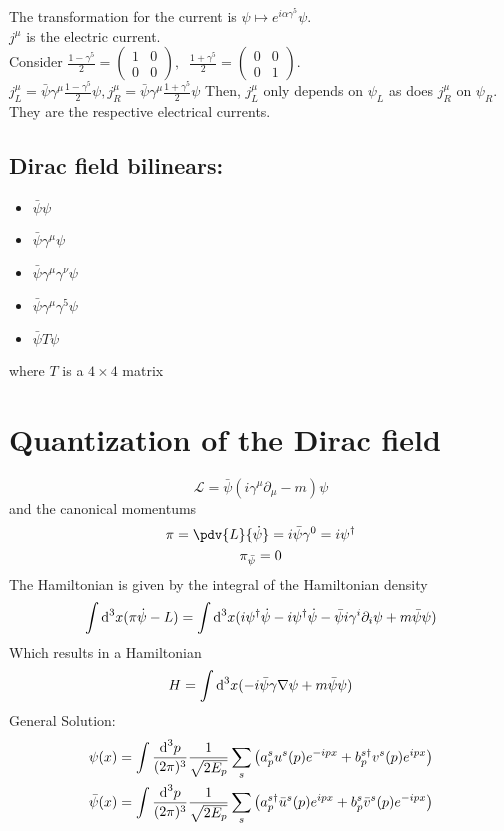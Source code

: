 \documentclass[]{scrartcl}
\begin{document}
The transformation for the current is $\psi \mapsto e^{i\alpha\gamma^5}\psi$.\\
$j^\mu$ is the electric current.\\
Consider $\frac{1 - \gamma^5}{2} = 
\begin{pmatrix}
	1 & 0 \\ 0 & 0
\end{pmatrix},\;\; \frac{1 + \gamma^5}{2} = 
\begin{pmatrix}
	0 & 0 \\ 0 & 1
\end{pmatrix}.$\\
$j_L^\mu = \bar\psi\gamma^\mu \frac{1-\gamma^5}{2}\psi, j_R^\mu = \bar\psi\gamma^\mu \frac{1+\gamma^5}{2}\psi$
Then, $j_L^\mu$ only depends on $\psi_L$ as does $j_R^\mu$ on $\psi_R$. They are the respective electrical currents.

\subsection{Dirac field bilinears:}
\begin{itemize}
	\item $\bar\psi\psi$
	\item $\bar\psi\gamma^\mu\psi$
	\item $\bar\psi\gamma^\mu\gamma^\nu\psi$
	\item $\bar\psi\gamma^\mu\gamma^5\psi$
	\item $\bar\psi T \psi$
\end{itemize}
where $T$ is a $4\times4$ matrix

\section{Quantization of the Dirac field}
\begin{equation}
	\mathcal{L} = \bar\psi(i\gamma^\mu\partial_\mu - m)\psi
\end{equation}
and the canonical momentums
\begin{gather}
	\pi = \pdv{L}{\dot\psi} = i\bar\psi\gamma^0 = i\psi^\dagger\\
	\pi_{\bar\psi} = 0
\end{gather}
The Hamiltonian is given by the integral of the Hamiltonian density
\begin{equation}
	\int \text d^3x (\pi\dot\psi - L) = \int\text d^3x (i\psi^\dagger\dot\psi - i\psi^\dagger\dot\psi - \bar\psi i\gamma^i \partial_i\psi + m\bar\psi\psi)
\end{equation}
Which results in a Hamiltonian
\begin{equation}
	H = \int\text d^3x (-i\bar\psi\gamma\nabla\psi + m\bar\psi\psi)
\end{equation}
General Solution:
\begin{gather}
	\psi(x) = \int \frac{\text d^3p}{(2\pi)^3}\frac{1}{\sqrt{2E_p}}\sum_s \left(a_p^su^s(p)e^{-ipx} + b_p^{s\dagger}v^s(p)e^{ipx}\right)\\
	\bar\psi(x) = \int \frac{\text d^3p}{(2\pi)^3}\frac{1}{\sqrt{2E_p}}\sum_s \left(a_p^{s\dagger}\bar u^s(p) e^{ipx} + b^s_p \bar v^s(p) e^{-ipx}\right)
\end{gather}
\end{document}
